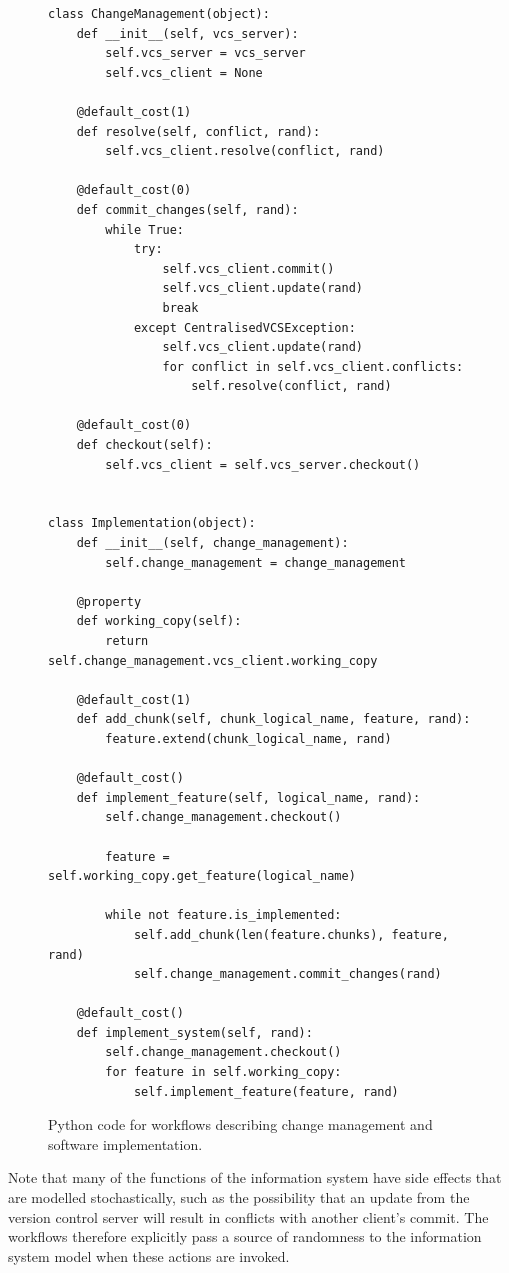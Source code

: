 \documentclass{llncs}
\begin{document}
\begin{figure}
  \centering
\begin{lstlisting}
class ChangeManagement(object):
    def __init__(self, vcs_server):
        self.vcs_server = vcs_server
        self.vcs_client = None

    @default_cost(1)
    def resolve(self, conflict, rand):
        self.vcs_client.resolve(conflict, rand)

    @default_cost(0)
    def commit_changes(self, rand):
        while True:
            try:
                self.vcs_client.commit()
                self.vcs_client.update(rand)
                break
            except CentralisedVCSException:
                self.vcs_client.update(rand)
                for conflict in self.vcs_client.conflicts:
                    self.resolve(conflict, rand)

    @default_cost(0)
    def checkout(self):
        self.vcs_client = self.vcs_server.checkout()


class Implementation(object):
    def __init__(self, change_management):
        self.change_management = change_management

    @property
    def working_copy(self):
        return self.change_management.vcs_client.working_copy

    @default_cost(1)
    def add_chunk(self, chunk_logical_name, feature, rand):
        feature.extend(chunk_logical_name, rand)

    @default_cost()
    def implement_feature(self, logical_name, rand):
        self.change_management.checkout()

        feature = self.working_copy.get_feature(logical_name)

        while not feature.is_implemented:
            self.add_chunk(len(feature.chunks), feature, rand)
            self.change_management.commit_changes(rand)

    @default_cost()
    def implement_system(self, rand):
        self.change_management.checkout()
        for feature in self.working_copy:
            self.implement_feature(feature, rand)

\end{lstlisting}
  \caption{Python code for workflows describing change management and software implementation.}
  \label{fig:workflows}

\end{figure}

Note that many of the functions of the information system have side effects that are modelled stochastically, such
as the possibility that an update from the version control server will result in conflicts with another client's commit.
The workflows therefore explicitly pass a source of randomness to the information system model when these actions are
invoked.
\end{document}
